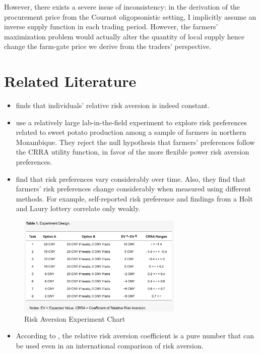\documentclass[12pt]{article}
\begin{document}
However, there exists a severe issue of inconsistency: in the derivation of the procurement price from the Cournot oligopsonistic setting, I implicitly assume an inverse supply function in each trading period. However, the farmers' maximization problem would actually alter the quantity of local supply hence change the farm-gate price we derive from the traders' perspective. 




\section{Related Literature}
\begin{itemize}
    \item \cite{chiappori2011relative} finds that individuals’ relative risk aversion is indeed constant. 
    
    \item \cite{de2014measuring} use a relatively large lab-in-the-field experiment to explore risk preferences related to sweet potato production among a sample of farmers in northern Mozambique. They reject the null hypothesis that farmers' preferences follow the CRRA utility function, in favor of the more flexible power risk aversion preferences. 

    \item \cite{finger2023stability} find that risk preferences vary considerably over time. Also, they find that farmers' risk preferences change considerably when measured using different methods. For example, self-reported risk preference and findings from a Holt and Laury lottery correlate only weakly. 
    
\end{itemize}

\begin{figure}[ht]
    \centering
    \includegraphics[width=0.7\textwidth]{figures/RA_experiment_chart.png}
    \caption{Risk Aversion Experiment Chart}
    \label{fig:Risk Aversion Experiment Chart}
\end{figure}


\begin{itemize}
    \item According to \cite{hardaker2000some}, the relative risk aversion coefficient is a pure number that can be used even in an international comparison of risk aversion.
\end{itemize}

\newpage

\end{document}
